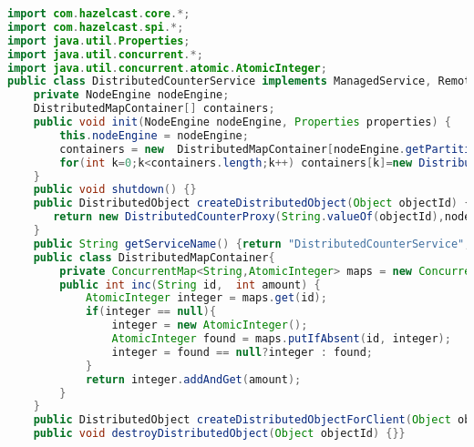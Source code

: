 \begin{lstlisting}[language=java]
import com.hazelcast.core.*;
import com.hazelcast.spi.*;
import java.util.Properties;
import java.util.concurrent.*;
import java.util.concurrent.atomic.AtomicInteger;
public class DistributedCounterService implements ManagedService, RemoteService {
    private NodeEngine nodeEngine;
    DistributedMapContainer[] containers;
    public void init(NodeEngine nodeEngine, Properties properties) {
        this.nodeEngine = nodeEngine;
        containers = new  DistributedMapContainer[nodeEngine.getPartitionService().getPartitionCount()];
        for(int k=0;k<containers.length;k++) containers[k]=new DistributedMapContainer();
    }
    public void shutdown() {}
    public DistributedObject createDistributedObject(Object objectId) {
       return new DistributedCounterProxy(String.valueOf(objectId),nodeEngine);
    }
    public String getServiceName() {return "DistributedCounterService";}
    public class DistributedMapContainer{
        private ConcurrentMap<String,AtomicInteger> maps = new ConcurrentHashMap<>();
        public int inc(String id,  int amount) {
            AtomicInteger integer = maps.get(id);
            if(integer == null){
                integer = new AtomicInteger();
                AtomicInteger found = maps.putIfAbsent(id, integer);
                integer = found == null?integer : found;
            }
            return integer.addAndGet(amount);
        }
    }
    public DistributedObject createDistributedObjectForClient(Object objectId) {return null;}
    public void destroyDistributedObject(Object objectId) {}}
\end{lstlisting}

